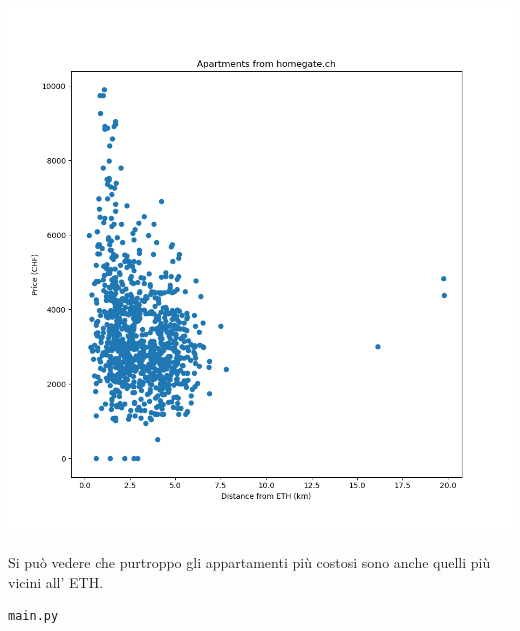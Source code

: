 \documentclass[12pt]{article}
\begin{document}
\includegraphics[scale=0.65]{homegate_distances}

Si può vedere che purtroppo gli appartamenti più costosi sono anche quelli più vicini all' ETH.

\newpage
\begin{verbatim}
main.py
\end{verbatim}
\end{document}
